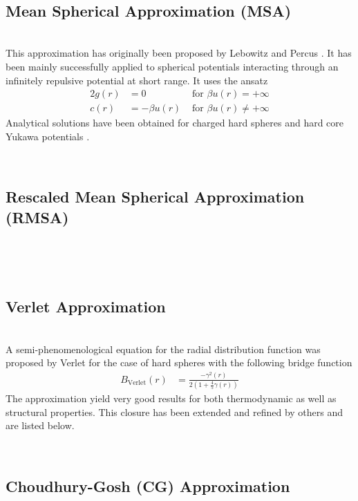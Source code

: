 ~\\
\subsection{Mean Spherical Approximation (MSA)}
~\\

This approximation has originally been proposed by Lebowitz and Percus \cite{Lebowitz1966}.
It has been mainly successfully applied to spherical potentials interacting through an infinitely
repulsive potential at short range. It uses the ansatz
\begin{alignat}{2}
g(r) &=  0 &\mbox{ for } \beta u(r) = +\infty \\
c(r) &= -\beta u(r) &\mbox{ for } \beta u(r) \neq +\infty
\end{alignat}
Analytical solutions have been obtained for charged hard spheres and hard core Yukawa potentials \cite{Caccamo1996}.

~\\
\subsection{Rescaled Mean Spherical Approximation (RMSA)}
~\\
\cite{Hansen1982}

~\\
\subsection{Verlet Approximation}
~\\

A semi-phenomenological equation for the radial distribution function was proposed by Verlet
\cite{Verlet1980,Verlet1981} for the case of hard spheres with the following bridge function
\begin{align} \label{eq:ozBHNC}
B_\text{Verlet}(r)
&=\frac{-\gamma^2(r)}{2\left(1+\frac{4}{5}\gamma(r)\right)}
\end{align}
The approximation yield very good results for both thermodynamic as well as structural properties.
This closure has been extended and refined by others and are listed below.

~\\
\subsection{Choudhury-Gosh (CG) Approximation}
~\\

